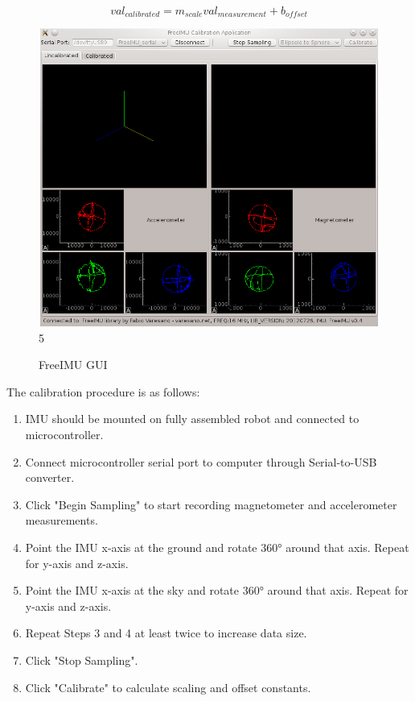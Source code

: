 \begin{equation}
val_{calibrated} = m_{scale} val_{measurement} + b_{offset}
\end{equation}

\begin{figure}[H]   %
	\centering \includegraphics[width=6in, height=3.85in, keepaspectratio]{figures/cal_gui.png}
5	\caption{FreeIMU GUI \cite{freeimu}}\label{fig:cal_gui}
\end{figure}

The calibration procedure is as follows:
\begin{enumerate}
	\item \ssp IMU should be mounted on fully assembled robot and connected to microcontroller.
	\item \ssp Connect microcontroller serial port to computer through Serial-to-USB converter.
	\item \ssp Click "Begin Sampling" to start recording magnetometer and accelerometer measurements.
	\item \ssp Point the IMU x-axis at the ground and rotate \ang{360} around that axis. Repeat for y-axis and z-axis.
	\item \ssp Point the IMU x-axis at the sky and rotate \ang{360} around that axis. Repeat for y-axis and z-axis.
	\item \ssp Repeat Steps 3 and 4 at least twice to increase data size.
	\item \ssp Click "Stop Sampling".
	\item \ssp Click "Calibrate" to calculate scaling and offset constants.
\end{enumerate}

